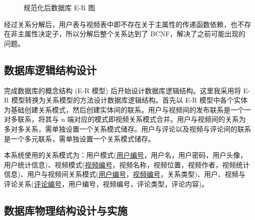 \begin{figure}[!ht]
    \centering
    \caption{规范化后数据库 E-R 图}
    \label{fig:ER2}
\end{figure}

经过关系分解后，用户表与视频表中即不存在关于主属性的传递函数依赖，也不存在非主属性决定子，所以分解后整个关系达到了 BCNF\cite{bernstein1976synthesizing}，解决了之前可能出现的问题。

\subsection{数据库逻辑结构设计}

完成数据库的概念结构 (E-R 模型) 后开始设计数据库逻辑结构\cite{gamma1995design}。这里我采用将 E-R 模型转换为关系模型的方法设计数据库逻辑结构。首先以 E-R 模型中各个实体为基础创建关系模式，然后创建实体间的联系。用户与视频间的发布联系是一个一对多联系，将其与 n 端对应的模式即视频关系模式合并。用户与视频间的关系为多对多关系，需单独设置一个关系模式储存。用户与评论以及视频与评论间的联系是一个多元联系，需单独设置一个关系模式\cite{王珊2006数据库系统概论}储存。

本系统使用的关系模式为：用户模式(\uline{用户编号}，用户名，用户密码，用户头像，用户统计信息)、视频模式(\uline{视频编号}，视频名称，视频位置，视频作者，视频统计信息)、用户与视频间关系模式(\uline{用户编号}，\uline{视频编号}，关系类型)、用户、视频与评论关系(\uline{评论编号}，用户编号，视频编号，评论类型，评论内容)。

\subsection{数据库物理结构设计与实施}


